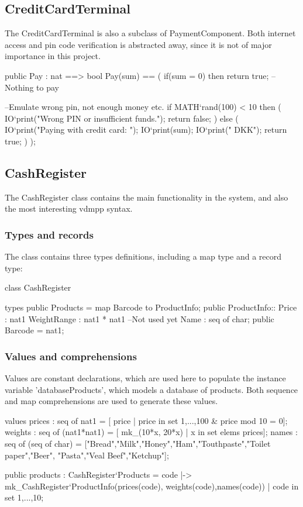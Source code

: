 \subsection{CreditCardTerminal}
The CreditCardTerminal is also a subclass of PaymentComponent. Both internet access and pin code verification is abstracted away, since it is not of major importance in this project.

\begin{vdmpp}
 public Pay : nat ==> bool
 Pay(sum) ==
 (
  if(sum = 0) then
   return true; -- Nothing to pay
   
 --Emulate wrong pin, not enough money etc.
  if MATH`rand(100) < 10 then 
  (
   IO`print("Wrong PIN or insufficient funds.\n");
   return false;
  ) else 
  (  
   IO`print("Paying with credit card: ");
   IO`print(sum);
   IO`print(" DKK\n");
   return true;
  )
 );	
\end{vdmpp}

\newpage
\subsection{CashRegister}
The CashRegister class contains the main functionality in the system, and also the most interesting vdmpp syntax.

\subsubsection{Types and records}
The class contains three types definitions, including a map type and a record type:
\begin{vdmpp}
class CashRegister

types
 public Products = map Barcode to ProductInfo;
 public ProductInfo::  Price : nat1
            WeightRange : nat1 * nat1 --Not used yet
            Name : seq of char;
 public Barcode = nat1;
\end{vdmpp}

\subsubsection{Values and comprehensions}
Values are constant declarations, which are used here to populate the instance variable 'databaseProducts', which models a database of products. Both sequence and map comprehensions are used to generate these values.
\begin{vdmpp}
values
 prices : seq of nat1 = [ price | price in set {1,...,100} & price mod 10 = 0];
 weights : seq of (nat1*nat1) = [ mk_(10*x, 20*x) | x in set elems prices];
 names : seq of (seq of char) = ["Bread","Milk","Honey","Ham","Touthpaste","Toilet paper","Beer",
 																"Pasta","Veal Beef","Ketchup"];
 
 public products : CashRegister`Products = {code |-> mk_CashRegister`ProductInfo(prices(code),
 																					weights(code),names(code)) | code in set {1,...,10}}; 
\end{vdmpp}

